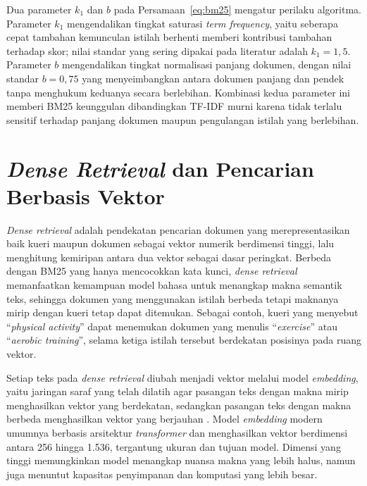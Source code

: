Dua parameter $k_1$ dan $b$ pada Persamaan~\ref{eq:bm25} mengatur perilaku algoritma. Parameter $k_1$ mengendalikan tingkat saturasi \textit{term frequency}, yaitu seberapa cepat tambahan kemunculan istilah berhenti memberi kontribusi tambahan terhadap skor; nilai standar yang sering dipakai pada literatur adalah $k_1 = 1{,}5$. Parameter $b$ mengendalikan tingkat normalisasi panjang dokumen, dengan nilai standar $b = 0{,}75$ yang menyeimbangkan antara dokumen panjang dan pendek tanpa menghukum keduanya secara berlebihan. Kombinasi kedua parameter ini memberi BM25 keunggulan dibandingkan TF-IDF murni karena tidak terlalu sensitif terhadap panjang dokumen maupun pengulangan istilah yang berlebihan.


\section{\textit{Dense Retrieval} dan Pencarian Berbasis Vektor}
\label{sec:dense-teori}

\textit{Dense retrieval} adalah pendekatan pencarian dokumen yang merepresentasikan baik kueri maupun dokumen sebagai vektor numerik berdimensi tinggi, lalu menghitung kemiripan antara dua vektor sebagai dasar peringkat. Berbeda dengan BM25 yang hanya mencocokkan kata kunci, \textit{dense retrieval} memanfaatkan kemampuan model bahasa untuk menangkap makna semantik teks, sehingga dokumen yang menggunakan istilah berbeda tetapi maknanya mirip dengan kueri tetap dapat ditemukan. Sebagai contoh, kueri yang menyebut ``\textit{physical activity}'' dapat menemukan dokumen yang menulis ``\textit{exercise}'' atau ``\textit{aerobic training}'', selama ketiga istilah tersebut berdekatan posisinya pada ruang vektor.

Setiap teks pada \textit{dense retrieval} diubah menjadi vektor melalui model \textit{embedding}, yaitu jaringan saraf yang telah dilatih agar pasangan teks dengan makna mirip menghasilkan vektor yang berdekatan, sedangkan pasangan teks dengan makna berbeda menghasilkan vektor yang berjauhan \parencite{reimers2019sbert}. Model \textit{embedding} modern umumnya berbasis arsitektur \textit{transformer} dan menghasilkan vektor berdimensi antara 256 hingga 1.536, tergantung ukuran dan tujuan model. Dimensi yang tinggi memungkinkan model menangkap nuansa makna yang lebih halus, namun juga menuntut kapasitas penyimpanan dan komputasi yang lebih besar.


